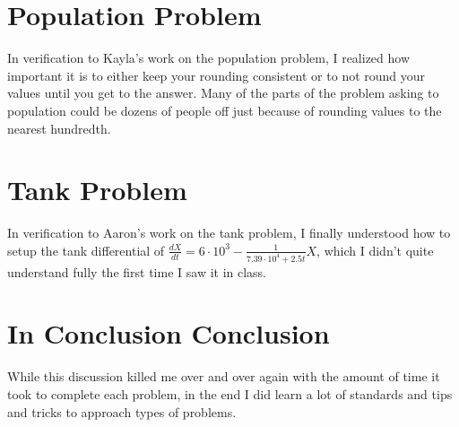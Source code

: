 \documentclass[12pt]{article}
\begin{document}
\section{Population Problem}
In verification to Kayla's work on the population problem, I realized how important it is to either keep your rounding consistent or to not round your values until you get to the answer. Many of the parts of the problem asking to population could be dozens of people off just because of rounding values to the nearest hundredth.
\section{Tank Problem}
In verification to Aaron's work on the tank problem, I finally understood how to setup the tank differential of $\frac{dX}{dt}=6\cdot10^{3}-\frac{1}{7.39\cdot10^{4}+2.5t}X$, which I didn't quite understand fully the first time I saw it in class.
\section{In Conclusion Conclusion}
While this discussion killed me over and over again with the amount of time it took to complete each problem, in the end I did learn a lot of standards and tips and tricks to approach types of problems.
\end{document}
